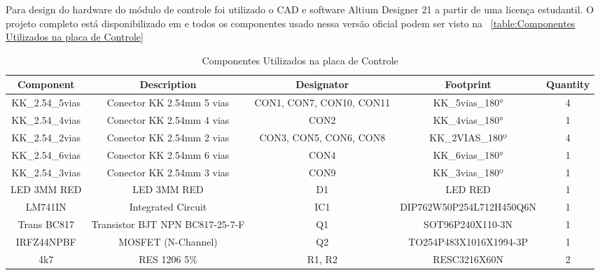 \documentclass[../delivery_hospital_report.tex]{subfiles}
\begin{document}
Para design do hardware do módulo de controle foi utilizado o CAD e software Altium Designer 21 \cite{altium21} a partir de uma licença estudantil. O projeto completo está disponibilizado em \cite{github_modulos} e todos os componentes usado nessa versão oficial podem ser visto na ~\ref{table:Componentes Utilizados na placa de Controle}

\begin{table}[h]
\caption{Componentes Utilizados na placa de Controle}
\centering
\begin{adjustbox}{width=\columnwidth,center}
\begin{tabular}{|c|c|c|c|c|}
\hline
Component        & Description                                    & Designator                 & Footprint                & Quantity \\ \hline
KK\_2.54\_5vias  & Conector KK 2.54mm 5   vias                    & CON1, CON7, CON10,   CON11 & KK\_5vias\_180°          & 4        \\ \hline
KK\_2.54\_4vias  & Conector KK 2.54mm 4   vias                    & CON2                       & KK\_4vias\_180°          & 1        \\ \hline
KK\_2.54\_2vias  & Conector KK 2.54mm 2   vias                    & CON3, CON5, CON6,   CON8   & KK\_2VIAS\_180º          & 4        \\ \hline
KK\_2.54\_6vias  & Conector KK 2.54mm 6   vias                    & CON4                       & KK\_6vias\_180°          & 1        \\ \hline
KK\_2.54\_3vias  & Conector KK 2.54mm 3   vias                    & CON9                       & KK\_3vias\_180º          & 1        \\ \hline
LED 3MM RED      & LED 3MM RED                                    & D1                         & LED RED                  & 1        \\ \hline
LM741IN          & Integrated Circuit                             & IC1                        & DIP762W50P254L712H450Q6N & 1        \\ \hline
Trans BC817      & Transistor BJT NPN   BC817-25-7-F              & Q1                         & SOT96P240X110-3N         & 1        \\ \hline
IRFZ44NPBF       & MOSFET (N-Channel)                             & Q2                         & TO254P483X1016X1994-3P   & 1        \\ \hline
4k7              & RES 1206 5\%                                   & R1, R2                     & RESC3216X60N             & 2        \\ \hline

\end{tabular}
\end{adjustbox}
\end{table}
\end{document}
